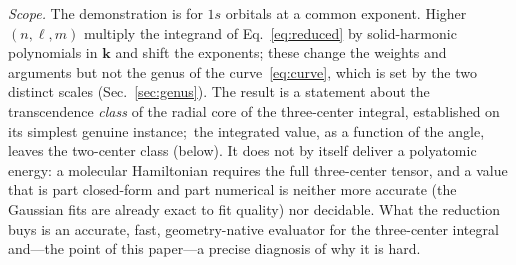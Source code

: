 \documentclass[aps,pra,twocolumn,superscriptaddress,longbibliography]{revtex4-2}
\begin{document}
\emph{Scope.}  The demonstration is for $1s$ orbitals at a common exponent.
Higher $(n,\ell,m)$ multiply the integrand of Eq.~\eqref{eq:reduced} by
solid-harmonic polynomials in $\bm k$ and shift the exponents; these change
the weights and arguments but not the genus of the curve~\eqref{eq:curve},
which is set by the two distinct scales (Sec.~\ref{sec:genus}).  The result is a statement about the
transcendence \emph{class} of the radial core of the three-center integral, established on its
simplest genuine instance;\ the integrated value, as a function of the angle, leaves the
two-center class (below).  It does not by itself deliver a polyatomic energy:
a molecular Hamiltonian requires the full three-center tensor, and a value
that is part closed-form and part numerical is neither more accurate (the
Gaussian fits are already exact to fit quality) nor decidable.  What the
reduction buys is an accurate, fast, geometry-native evaluator for the
three-center integral and---the point of this paper---a precise diagnosis of
why it is hard.
\end{document}
